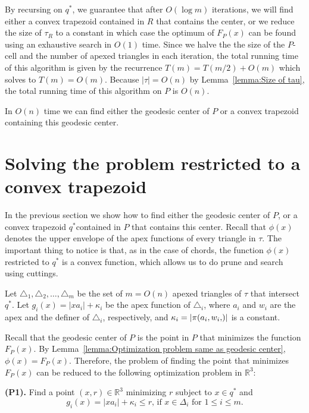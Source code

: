 \documentclass[a4paper,UKenglish]{lipics}
\newcommand{\F}[2]{\ensuremath{F_{\scriptscriptstyle #1}(#2)}}
\newcommand{\g}[2]{\ensuremath{|\pi(#1, #2)|}}
\begin{document}
By recursing on $q^*$, we guarantee that after $O(\log m)$ iterations, we will find either a convex trapezoid contained in $R$ that contains the center, or we reduce the size of $\tau_R$ to a constant in which case the optimum of $\F{P}{x}$ can be found using an exhaustive search in $O(1)$ time. Since we halve the the size of the $P$-cell and the number of apexed triangles in each iteration, the total running time of this algorithm is given by the recurrence $T(m) = T(m/2) + O(m)$ which solves to $T(m) = O(m)$. 
Because $|\tau| = O(n)$ by Lemma~\ref{lemma:Size of tau}, the total running time of this algorithm on $P$ is $O(n)$.

\begin{lemma}\label{lemma:Finding the convex trapezoid}
In $O(n)$ time we can find either the geodesic center of $P$ or a convex trapezoid containing this geodesic center.
\end{lemma}


\section{Solving the problem restricted to a convex trapezoid}
In the previous section we show how to find either the geodesic center of $P$, or a convex trapezoid $q^*$contained in $P$ that contains this center. 
Recall that $\phi(x)$ denotes the upper envelope of the apex functions of every triangle in $\tau$.
The important thing to notice is that, as in the case of chords, the function $\phi(x)$ restricted to $q^*$ is a convex function, which allows us to do prune and search using cuttings.

Let $\triangle_{1}, \triangle_{2}, \ldots, \triangle_{m}$ be the set of $m= O(n)$ apexed triangles of $\tau$ that intersect $q^*$. Let $g_i(x) = |x a_i| + \kappa_i$ be the apex function of $\triangle_i$, where $a_i$ and $w_i$ are the apex and the definer of $\triangle_i$, respectively, and $\kappa_i = \g{a_i, w_i}$ is a constant.

Recall that the geodesic center of $P$ is the point in $P$ that minimizes the function $\F{P}{x}$.
By Lemma~\ref{lemma:Optimization problem same as geodesic center}, $\phi(x) = \F{P}{x}$. 
Therefore, the problem of finding the point that minimizes $\F{P}{x}$ can be reduced to the following optimization problem in $\mathbb{R}^3$:

\textbf{(P1).} Find a point $(x,r)\in \mathbb{R}^3$ minimizing $r$ subject to $x\in q^*$ and
$$\text{$g_i(x) = |x a_i| + \kappa_i \leq r$, if $x\in \Delta_{i}$ for $1\leq i \leq m$}.$$
\end{document}

